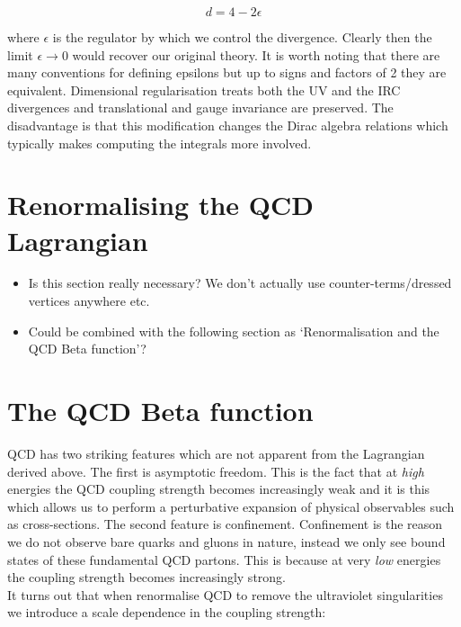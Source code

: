 		\begin{equation}
			d=4-2\epsilon
		\end{equation}

		where $\epsilon$ is the regulator by which we control the divergence. Clearly then the limit
		$\epsilon\rightarrow 0$ would recover our original theory.  It is worth noting that there are many
		conventions for defining epsilons but up to signs and factors of 2 they are equivalent. Dimensional
		regularisation treats both the UV and the IRC divergences and translational and gauge invariance are
		preserved.  The disadvantage is that this modification changes the Dirac algebra relations which
		typically makes computing the integrals more involved.

\section{Renormalising the QCD Lagrangian}
	\label{sec:renormalisation}

	{\color{red}
	\begin{itemize}
		\item Is this section really necessary?  We don't actually use counter-terms/dressed vertices anywhere etc.
		\item Could be combined with the following section as `Renormalisation and the QCD Beta function'?
	\end{itemize}
	}

\section{The QCD Beta function}
	\label{fig:betaFunction}

	QCD has two striking features which are not apparent from the Lagrangian derived above.  The first is asymptotic freedom.
	This is the fact that at \emph{high} energies the QCD coupling strength becomes increasingly weak and it is this which allows us to
	perform a perturbative expansion of physical observables such as cross-sections.  The second feature is confinement.  Confinement
	is the reason we do not observe bare quarks and gluons in nature, instead we only see bound states of these fundamental QCD partons.
	This is because at very \emph{low} energies the coupling strength becomes increasingly strong.\\It turns out that when
	renormalise QCD to remove the ultraviolet singularities we introduce a scale dependence in the coupling strength:

